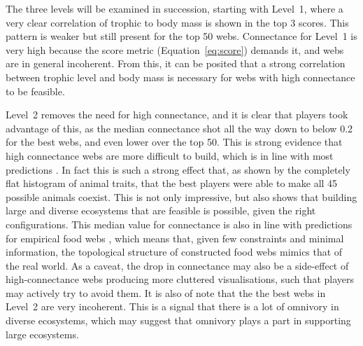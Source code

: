 The three levels will be examined in succession, starting with Level~1, where a very clear correlation of trophic to body mass is shown in the top 3 scores. This pattern is weaker but still present for the top 50 webs.
Connectance for Level~1 is very high because the score metric (Equation~\eqref{eq:score}) demands it, and webs are in general incoherent. From this, it can be posited that a strong correlation between trophic level and body mass is necessary for webs with high connectance to be feasible.

Level~2 removes the need for high connectance, and it is clear that players took advantage of this, as the median connectance shot all the way down to below 0.2 for the best webs, and even lower over the top 50. This is strong evidence that high connectance webs are more difficult to build, which is in line with most predictions \cite{May1973,Allesina2012}.
In fact this is such a strong effect that, as shown by the completely flat histogram of animal traits, that the best players were able to make all 45 possible animals coexist. This is not only impressive, but also shows that building large and diverse ecosystems that are feasible is possible, given the right configurations.
This median value for connectance is also in line with predictions for empirical food webs \cite{Goldwasser1997}, which means that, given few constraints and minimal information, the topological structure of constructed food webs mimics that of the real world.
As a caveat, the drop in connectance may also be a side-effect of high-connectance webs producing more cluttered visualisations, such that players may actively try to avoid them.
It is also of note that the the best webs in Level~2 are very incoherent. This is a signal that there is a lot of omnivory in diverse ecosystems, which may suggest that omnivory plays a part in supporting large ecosystems.

